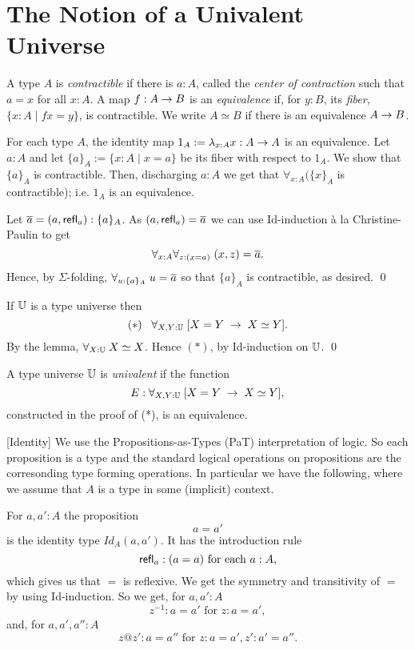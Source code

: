 \section{The Notion of a Univalent Universe}
 A type $A$ is {\em contractible} if there is $a:A$, called the {\em center of contraction} such that $a=x$ for all $x:A$.
 A map $f:A\rightarrow B$ is an {\em equivalence}
if, for $y:B$, its {\em fiber}, $\{x:A\mid fx = y\}$, is contractible.
We write $A\simeq B$ if  there is an equivalence $A\rightarrow B$.

\label{lem:2.3}  For each type $A$, the identity map 
$1_A:= \lambda_{x:A}x :A\rightarrow A$ is an equivalence.
\proof  Let $a:A$ and let $\{ a\}_A:= \{ x:A\mid x=a\}$ be its fiber with respect to $1_A$.  We show that $\{ a\}_A$ is contractible.  Then, discharging $a:A$ we get that $\forall_{x:A}(\{ x\}_A$ is contractible); i.e. $1_A$ is an equivalence.

Let $\overline{a} =(a,\mathsf{refl}_{a}):\{ a\}_A$.  As $(a,\mathsf{refl}_{a}) = \overline{a}$ we can use Id-induction \`{a} la Christine-Paulin to get
  \[\forall_{x:A}\forall_{z:(x=a)}\; (x,z)=\overline{a}.\]
Hence, by $\Sigma$-folding, $\forall_{u:\{ a\}_A}\; u=\overline{a}$ so that $\{ a\}_A$ is contractible, as desired.
\qed

If $\mathbb{U}$ is a type universe then
  \[ (*)\;\;\; \forall_{X,Y:\mathbb{U}}\; [X=Y\;\rightarrow\; X\simeq Y].\]
\proof
By the lemma, $\forall_{X:\mathbb{U}}\; X\simeq X$.  Hence $(*)$, by Id-induction on $\mathbb{U}$.
\qed

A type universe $\mathbb{U}$ is {\em univalent} if the function
  \[ E:\forall_{X,Y:\mathbb{U}}\; [X=Y\;\rightarrow\; X\simeq Y],\] 
constructed in the proof of (*), is an equivalence.


[Identity] 
We use the Propositions-as-Types (PaT) interpretation of logic.  So each proposition is a type and the standard logical operations on propositions are the corresonding type forming operations.  In particular we have the following, where we assume that $A$ is a type in some (implicit) context.
\item For $a,a':A$ the proposition 
  \[ a=a'\] 
is the identity type $Id_A(a,a')$.  It has the introduction rule 
  \[\mathsf{refl}_{a}:(a=a) \mbox{ for each $a:A$},\]
which gives us that $=$ is reflexive.  We get the symmetry and transitivity of $=$ by using Id-induction.  So we get, for $a,a':A$
  \[ z^{-1}:a=a'\mbox{ for } z:a=a',\]
and, for $a,a',a'':A$
  \[ z@z':a=a''\mbox{ for $z:a=a',z':a'=a''$}.\]

